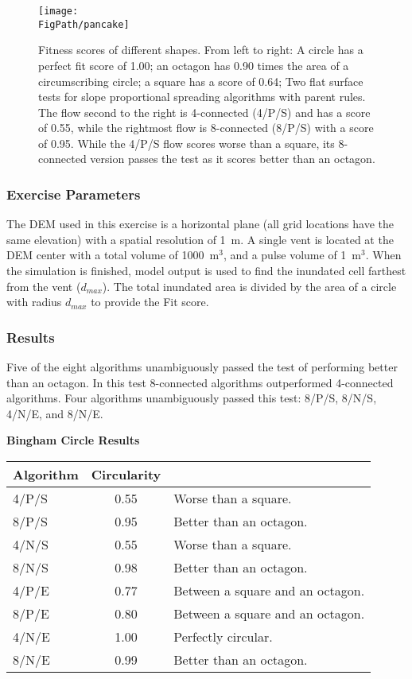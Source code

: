 		\begin{figure}[!h]
		\centering
		\texttt{[image: \\FigPath/pancake]}
		\caption[Fitness scores of different shaped flows on a flat surface]{Fitness scores of different shapes. From left to right: A circle has a perfect fit score of 1.00; an octagon has 0.90 times the area of a circumscribing circle; a square has a score of 0.64; Two flat surface tests for slope proportional spreading algorithms with parent rules. The flow second to the right is 4-connected (4/P/S) and has a score of 0.55, while the rightmost flow is 8-connected (8/P/S) with a score of 0.95. While the 4/P/S flow scores worse than a square, its 8-connected version passes the test as it scores better than an octagon.}
		\label{fig_pancake}
	\end{figure}
	
		\subsubsection{Exercise Parameters} The DEM used in this exercise is a horizontal plane (all grid locations have the same elevation) with a spatial resolution of 1~m. A single vent is located at the DEM center with a total volume of 1000~m$^3$, and a pulse volume of 1~m$^3$. When the simulation is finished, model output is used to find the inundated cell farthest from the vent ($d_{max}$). The total inundated area is divided by the area of a circle with radius $d_{max}$ to provide the Fit score.
		
		\subsubsection{Results}

		Five of the eight algorithms unambiguously passed the test of performing better than an octagon. In this test 8-connected algorithms outperformed 4-connected algorithms. Four algorithms unambiguously passed this test: 8/P/S, 8/N/S, 4/N/E, and 8/N/E.
		
		\begin{center}
			\textbf{Bingham Circle Results}\\
			\begin{tabular}{l c l}
				\toprule
				Algorithm&Circularity&\\
				\midrule
				4/P/S & 0.55 & Worse than a square.\\
				8/P/S & 0.95 & Better than an octagon.\\
				4/N/S & 0.55 & Worse than a square.\\
				8/N/S & 0.98 & Better than an octagon.\\
				4/P/E & 0.77 & Between a square and an octagon.\\
				8/P/E & 0.80 & Between a square and an octagon.\\
				4/N/E & 1.00 & Perfectly circular.\\
				8/N/E & 0.99 & Better than an octagon.\\
				
				\bottomrule
			\end{tabular}
		\end{center}
		
